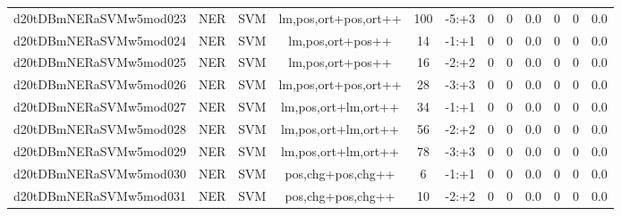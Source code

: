 \documentclass[a4paper]{article}
\begin{document}
\begin{landscape}
\begin{center}
\begin{tabular}{ |c|c|c|c|c|c|c|c|c|c|c|c|}
 	

 
 	
 	\small{ d20tDBmNERaSVMw5mod023 } & \small{ NER} & \small{  SVM }  & lm,pos,ort+pos,ort++  &  100 &  \small{  -5:+3 }  &  0 & 0 & 0.0  &  0 & 0 & 0.0 \\
 	

 
 	
 	\small{ d20tDBmNERaSVMw5mod024 } & \small{ NER} & \small{  SVM }  & lm,pos,ort+pos++  &  14 &  \small{  -1:+1 }  &  0 & 0 & 0.0  &  0 & 0 & 0.0 \\
 	

 
 	
 	\small{ d20tDBmNERaSVMw5mod025 } & \small{ NER} & \small{  SVM }  & lm,pos,ort+pos++  &  16 &  \small{  -2:+2 }  &  0 & 0 & 0.0  &  0 & 0 & 0.0 \\
 	

 
 	
 	\small{ d20tDBmNERaSVMw5mod026 } & \small{ NER} & \small{  SVM }  & lm,pos,ort+pos,ort++  &  28 &  \small{  -3:+3 }  &  0 & 0 & 0.0  &  0 & 0 & 0.0 \\
 	

 
 	
 	\small{ d20tDBmNERaSVMw5mod027 } & \small{ NER} & \small{  SVM }  & lm,pos,ort+lm,ort++  &  34 &  \small{  -1:+1 }  &  0 & 0 & 0.0  &  0 & 0 & 0.0 \\
 	

 
 	
 	\small{ d20tDBmNERaSVMw5mod028 } & \small{ NER} & \small{  SVM }  & lm,pos,ort+lm,ort++  &  56 &  \small{  -2:+2 }  &  0 & 0 & 0.0  &  0 & 0 & 0.0 \\
 	

 
 	
 	\small{ d20tDBmNERaSVMw5mod029 } & \small{ NER} & \small{  SVM }  & lm,pos,ort+lm,ort++  &  78 &  \small{  -3:+3 }  &  0 & 0 & 0.0  &  0 & 0 & 0.0 \\
 	

 
 	
 	\small{ d20tDBmNERaSVMw5mod030 } & \small{ NER} & \small{  SVM }  & pos,chg+pos,chg++  &  6 &  \small{  -1:+1 }  &  0 & 0 & 0.0  &  0 & 0 & 0.0 \\
 	

 
 	
 	\small{ d20tDBmNERaSVMw5mod031 } & \small{ NER} & \small{  SVM }  & pos,chg+pos,chg++  &  10 &  \small{  -2:+2 }  &  0 & 0 & 0.0  &  0 & 0 & 0.0 \\
 	


\end{tabular}
\end{center}
\end{landscape}
\end{document}
